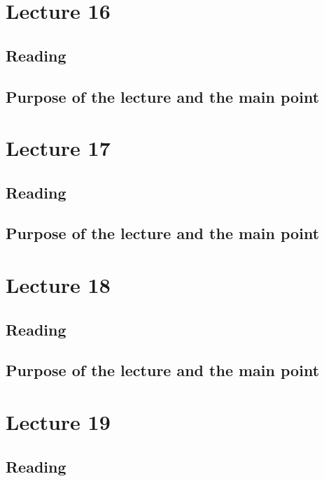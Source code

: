 \section{Lecture 16}


\subsection{Reading}


\subsection{Purpose of the lecture and the main point}




\section{Lecture 17}

\subsection{Reading}


\subsection{Purpose of the lecture and the main point}


\section{Lecture 18}

\subsection{Reading}


\subsection{Purpose of the lecture and the main point}


\section{Lecture 19}



\subsection{Reading}


